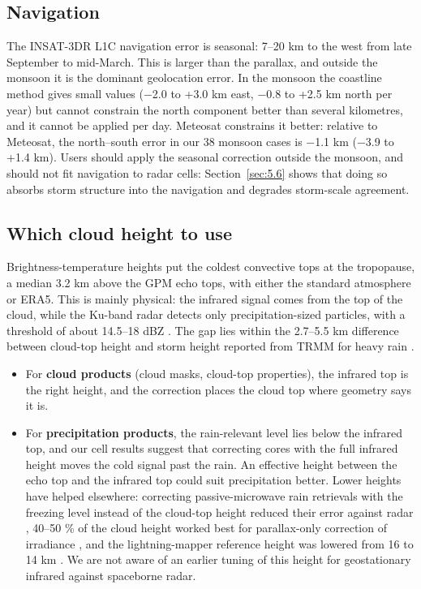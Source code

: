 \subsection{Navigation}\label{sec:6.3}

The INSAT-3DR L1C navigation error is seasonal: 7--20 km to the west from late September to mid-March. This is larger than the parallax, and outside the monsoon it is the dominant geolocation error. In the monsoon the coastline method gives small values (−2.0 to +3.0 km east, −0.8 to +2.5 km north per year) but cannot constrain the north component better than several kilometres, and it cannot be applied per day. Meteosat constrains it better: relative to Meteosat, the north--south error in our 38 monsoon cases is −1.1 km (−3.9 to +1.4 km). Users should apply the seasonal correction outside the monsoon, and should not fit navigation to radar cells: Section~\ref{sec:5.6} shows that doing so absorbs storm structure into the navigation and degrades storm-scale agreement.

\subsection{Which cloud height to use}\label{sec:6.4}

Brightness-temperature heights put the coldest convective tops at the tropopause, a median 3.2 km above the GPM echo tops, with either the standard atmosphere or ERA5. This is mainly physical: the infrared signal comes from the top of the cloud, while the Ku-band radar detects only precipitation-sized particles, with a threshold of about 14.5--18 dBZ \citep{toyoshima2015}. The gap lies within the 2.7--5.5 km difference between cloud-top height and storm height reported from TRMM for heavy rain \citep{song2020}.

\begin{itemize}
\tightlist
\item
  For \textbf{cloud products} (cloud masks, cloud-top properties), the infrared top is the right height, and the correction places the cloud top where geometry says it is.
\item
  For \textbf{precipitation products}, the rain-relevant level lies below the infrared top, and our cell results suggest that correcting cores with the full infrared height moves the cold signal past the rain. An effective height between the echo top and the infrared top could suit precipitation better. Lower heights have helped elsewhere: correcting passive-microwave rain retrievals with the freezing level instead of the cloud-top height reduced their error against radar \citep{monsalve2026}, 40--50 \% of the cloud height worked best for parallax-only correction of irradiance \citep{wiltink2025}, and the lightning-mapper reference height was lowered from 16 to 14 km \citep{virts2020}. We are not aware of an earlier tuning of this height for geostationary infrared against spaceborne radar.
\end{itemize}

